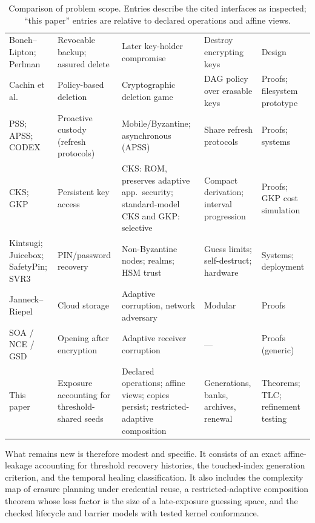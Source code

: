 \documentclass[pdflatex,sn-mathphys-num]{sn-jnl}%
\theoremstyle{plain}
\theoremstyle{definition}
\begin{document}
\begin{table}[t]
\caption{Comparison of problem scope. Entries describe the cited interfaces as inspected; ``this paper'' entries are relative to declared operations and affine views.}\label{tab:comparison}
\centering\footnotesize
\altrows
\begin{tabularx}{\linewidth}{@{}>{\raggedright\arraybackslash}p{.15\linewidth}YYYY@{}}\toprule
{} &  &  &  & \\\midrule
Boneh--Lipton; Perlman & Revocable backup; assured delete & Later key-holder compromise & Destroy encrypting keys & Design\\
Cachin et al. & Policy-based deletion & Cryptographic deletion game & DAG policy over erasable keys & Proofs; filesystem prototype\\
PSS; APSS; CODEX & Proactive custody (refresh protocols) & Mobile/Byzantine; asynchronous (APSS) & Share refresh protocols & Proofs; systems\\
CKS; GKP & Persistent key access & CKS: ROM, preserves adaptive app.\ security; standard-model CKS and GKP: selective & Compact derivation; interval progression & Proofs; GKP cost simulation\\
Kintsugi; Juicebox; SafetyPin; SVR3 & PIN/password recovery & Non-Byzantine nodes; realms; HSM trust & Guess limits; self-destruct; hardware & Systems; deployment\\
Janneck--Riepel & Cloud storage & Adaptive corruption, network adversary & Modular & Proofs\\
SOA / NCE / GSD & Opening after encryption & Adaptive receiver corruption & --- & Proofs (generic)\\
This paper & Exposure accounting for threshold-shared seeds & Declared operations; affine views; copies persist; restricted-adaptive composition & Generations, banks, archives, renewal & Theorems; TLC; refinement testing\\\bottomrule
\end{tabularx}
\end{table}

What remains new is therefore modest and specific. It consists of an exact affine-leakage accounting for threshold recovery histories, the touched-index generation criterion, and the temporal healing classification. It also includes the complexity map of erasure planning under credential reuse, a restricted-adaptive composition theorem whose loss factor is the size of a late-exposure guessing space, and the checked lifecycle and barrier models with tested kernel conformance.
\end{document}
